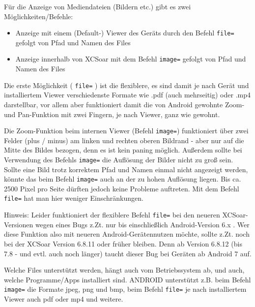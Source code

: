 Für die Anzeige von Mediendateien (Bildern etc.) gibt es zwei Möglichkeiten/Befehle:

\begin{itemize}
\item Anzeige mit einem (Default-) Viewer des Geräts durch den Befehl \verb|file=| gefolgt von Pfad und Namen des Files
\item Anzeige innerhalb von XCSoar mit dem Befehl \verb|image=| gefolgt von Pfad und Namen des Files
\end{itemize}



Die erste Möglichkeit ( \verb|file=| ) ist die flexiblere, es sind damit je nach Gerät und installiertem Viewer verschiedenste Formate wie .pdf (auch mehrseitig) oder .mp4 darstellbar, vor allem aber funktioniert damit die von Android gewohnte Zoom- und Pan-Funktion mit zwei Fingern, je nach Viewer, ganz wie gewohnt. 

Die Zoom-Funktion beim internen Viewer (Befehl \verb|image=|) funktioniert über zwei Felder (plus / minus) am linken und rechten oberen Bildrand - aber nur auf die Mitte des Bildes bezogen, denn es ist kein paning möglich. Außerdem sollte bei Verwendung des Befehls \verb|image=| die Auflösung der Bilder nicht zu groß sein. 
Sollte eine Bild trotz korrektem Pfad und Namen einmal nicht angezeigt werden, könnte das beim Befehl \verb|image=| auch an der zu hohen Auflösung liegen. Bis ca. 2500 Pixel pro Seite dürften jedoch keine Probleme auftreten. Mit dem Befehl \verb|file=| hat man hier weniger Einschränkungen. 

%
Hinweis: 
Leider funktioniert der flexiblere Befehl \verb|file=| bei den neueren XCSoar-Versionen wegen eines Bugs z.Zt. nur bis einschließlich Android-Version 6.x . Wer diese Funktion also mit neueren Android-Gerätennutzen möchte, sollte z.Zt. noch bei der XCSoar Version 6.8.11 oder früher bleiben. Denn ab Version 6.8.12 (bis 7.8 - und evtl. auch noch länger) taucht dieser Bug bei Geräten ab Android 7 auf.
% 
% 

Welche Files unterstützt werden, hängt auch vom Betriebssystem ab, und auch, welche Programme/Apps installiert sind. ANDROID unterstützt z.B. beim Befehl \verb|image=| die Formate jpeg, png und bmp, beim Befehl \verb|file=| je nach installiertem Viewer auch pdf oder mp4 und weitere.

